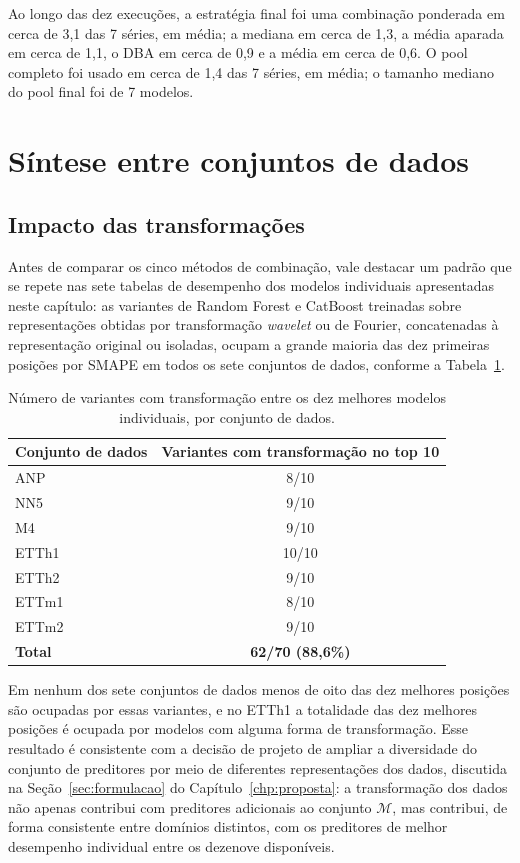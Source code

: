 Ao longo das dez execuções, a estratégia final foi uma combinação ponderada em cerca de 3,1 das 7 séries, em média; a mediana em cerca de 1,3, a média aparada em cerca de 1,1, o DBA em cerca de 0,9 e a média em cerca de 0,6. O pool completo foi usado em cerca de 1,4 das 7 séries, em média; o tamanho mediano do pool final foi de 7 modelos.
\section{Síntese entre conjuntos de dados} \label{sec:resultados-sintese}
\subsection{Impacto das transformações}

Antes de comparar os cinco métodos de combinação, vale destacar um padrão que se repete nas sete tabelas de desempenho dos modelos individuais apresentadas neste capítulo: as variantes de Random Forest e CatBoost treinadas sobre representações obtidas por transformação \textit{wavelet} ou de Fourier, concatenadas à representação original ou isoladas, ocupam a grande maioria das dez primeiras posições por SMAPE em todos os sete conjuntos de dados, conforme a Tabela~\ref{tab:sintese-transformacoes}.

\begin{table}[H]
\centering
\caption{Número de variantes com transformação entre os dez melhores modelos individuais, por conjunto de dados.}
\label{tab:sintese-transformacoes}
\begin{tabular}{@{}lc@{}}
\toprule
\textbf{Conjunto de dados} & \textbf{Variantes com transformação no top 10} \\
\midrule
ANP    & 8/10  \\
NN5    & 9/10  \\
M4     & 9/10  \\
ETTh1  & 10/10 \\
ETTh2  & 9/10  \\
ETTm1  & 8/10  \\
ETTm2  & 9/10  \\
\midrule
\textbf{Total} & \textbf{62/70 (88,6\%)} \\
\bottomrule
\end{tabular}
\end{table}

Em nenhum dos sete conjuntos de dados menos de oito das dez melhores posições são ocupadas por essas variantes, e no ETTh1 a totalidade das dez melhores posições é ocupada por modelos com alguma forma de transformação. Esse resultado é consistente com a decisão de projeto de ampliar a diversidade do conjunto de preditores por meio de diferentes representações dos dados, discutida na Seção~\ref{sec:formulacao} do Capítulo~\ref{chp:proposta}: a transformação dos dados não apenas contribui com preditores adicionais ao conjunto $\mathcal{M}$, mas contribui, de forma consistente entre domínios distintos, com os preditores de melhor desempenho individual entre os dezenove disponíveis.

